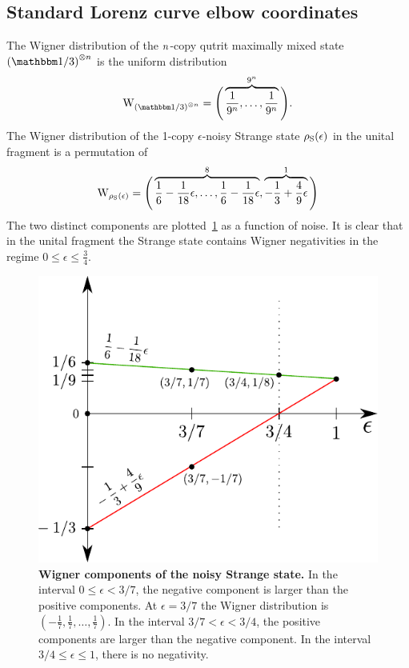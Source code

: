 \subsection{Standard Lorenz curve elbow coordinates}\label{app:lcsu_coord_elb}
The Wigner distribution of the $n$-copy qutrit maximally mixed state $\left(\id/3\right)\too{\NN}$ is the uniform distribution 
\begin{equation}\label{eq:wu}
	\W{\left(\id/3\right)\too{\NN}} = \Bigg( \overbrace{\frac{1}{9^\NN}, \dots, \frac{1}{9^\NN}}^{9^\NN} \Bigg).
\end{equation}
The Wigner distribution of the 1-copy $\epsilon$-noisy Strange state $\rho_{\rm{S}}(\epsilon)$ in the unital fragment is a permutation of 
\begin{equation}\label{eq:wsu}
	\W{\noisys(\epsilon)} = \Bigg( \overbrace{\frac{1}{6} - \frac{1}{18}\epsilon, \dots, \frac{1}{6} - \frac{1}{18}\epsilon}^8, \overbrace{-\frac{1}{3} + \frac{4}{9}\epsilon}^1 \Bigg)
\end{equation}
The two distinct components are plotted~\cref{fig:noisys} as a function of noise. 
It is clear that in the unital fragment the Strange state contains Wigner negativities in the regime $0 \leq \epsilon \leq \tfrac{3}{4}$.
\begin{figure}[h]
    \centering
    \includegraphics[scale=0.7]{figs/noisys.pdf}
    \caption{\textbf{Wigner components of the noisy Strange state.} 
    In the interval $0 \leq \epsilon < 3/7$, the negative component is larger than the positive components.
    At $\epsilon = 3/7$ the Wigner distribution is $(-\frac{1}{7},\frac{1}{7},\dots,\frac{1}{7})$.
    In the interval $3/7 < \epsilon < 3/4$, the positive components are larger than the negative component.
    In the interval $3/4 \leq \epsilon \leq 1$, there is no negativity.
    }
    \label{fig:noisys}
\end{figure}

